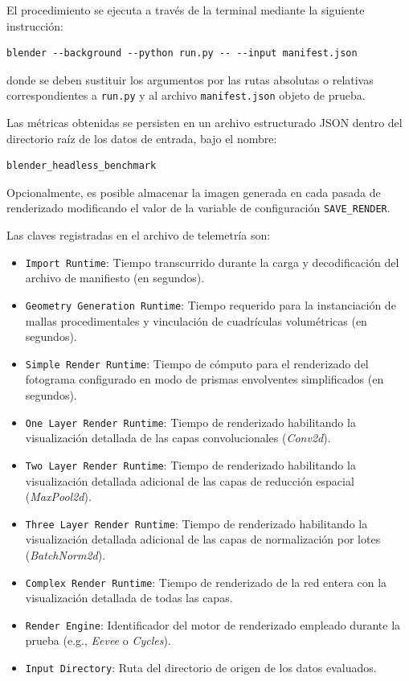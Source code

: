 El procedimiento se ejecuta a través de la terminal mediante la siguiente instrucción:
\begin{verbatim}
blender --background --python run.py -- --input manifest.json
\end{verbatim}
donde se deben sustituir los argumentos por las rutas absolutas o relativas correspondientes a \texttt{run.py} y 
al archivo \texttt{manifest.json} objeto de prueba.
\medskip

Las métricas obtenidas se persisten en un archivo estructurado JSON dentro del directorio raíz de los datos de entrada, 
bajo el nombre:
\begin{verbatim}
blender_headless_benchmark
\end{verbatim}

Opcionalmente, es posible almacenar la imagen generada en 
cada pasada de renderizado modificando el valor de la variable de configuración \texttt{SAVE\_RENDER}.
\medskip

Las claves registradas en el archivo de telemetría son:
\begin{itemize}
    \item \texttt{Import Runtime}: Tiempo transcurrido durante la carga y decodificación del archivo 
    de manifiesto (en segundos).
    \item \texttt{Geometry Generation Runtime}: Tiempo requerido para la instanciación de mallas 
    procedimentales y vinculación de cuadrículas volumétricas (en segundos).
    \item \texttt{Simple Render Runtime}: Tiempo de cómputo para el renderizado del fotograma 
    configurado en modo de prismas envolventes simplificados (en segundos).
    \item \texttt{One Layer Render Runtime}: Tiempo de renderizado habilitando la visualización
    detallada de las capas convolucionales (\textit{Conv2d}).
    \item \texttt{Two Layer Render Runtime}: Tiempo de renderizado habilitando la visualización 
    detallada adicional de las capas de reducción espacial (\textit{MaxPool2d}).
    \item \texttt{Three Layer Render Runtime}: Tiempo de renderizado habilitando la visualización 
    detallada adicional de las capas de normalización por lotes (\textit{BatchNorm2d}).
    \item \texttt{Complex Render Runtime}: Tiempo de renderizado de la red entera con la visualización
    detallada de todas las capas.
    \item \texttt{Render Engine}: Identificador del motor de renderizado empleado durante la prueba 
    (e.g., \textit{Eevee} o \textit{Cycles}).
    \item \texttt{Input Directory}: Ruta del directorio de origen de los datos evaluados.
\end{itemize}

